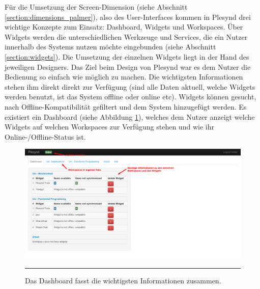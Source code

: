 Für die Umsetzung der Screen-Dimension (siehe Abschnitt \ref{section:dimensions_palmer}), also des User-Interfaces kommen in Plesynd drei wichtige Konzepte zum Einsatz: Dashboard, Widgets und Workspaces. Über Widgets werden die unterschiedlichen Werkzeuge und Services, die ein Nutzer innerhalb des Systems nutzen möchte eingebunden (siehe Abschnitt \ref{section:widgets}). Die Umsetzung der einzelnen Widgets liegt in der Hand des jeweiligen Designers. Das Ziel beim Design von Plesynd war es dem Nutzer die Bedienung so einfach wie möglich zu machen. Die wichtigsten Informationen stehen ihm direkt direkt zur Verfügung (sind alle Daten aktuell, welche Widgets werden benutzt, ist das System offline oder online etc). Widgets können gesucht, nach Offline-Kompatibilität gefiltert und dem System hinzugefügt werden. Es existiert ein Dashboard (siehe Abbildung \ref{fig:plesynd_dashboard}), welches dem Nutzer anzeigt welche Widgets auf welchen Workspaces zur Verfügung stehen und wie ihr Online-/Offline-Status ist.
\begin{figure}
  \centering
  \includegraphics[width=\textwidth,height=\textheight,keepaspectratio]{./Figures/plesynd_dashboard.png}
    \rule{35em}{0.5pt}
  \caption[Plesynd User-Interface: Dashboard]{Das Dashboard fasst die wichtigsten Informationen zusammen.}
  \label{fig:plesynd_dashboard}
\end{figure}

